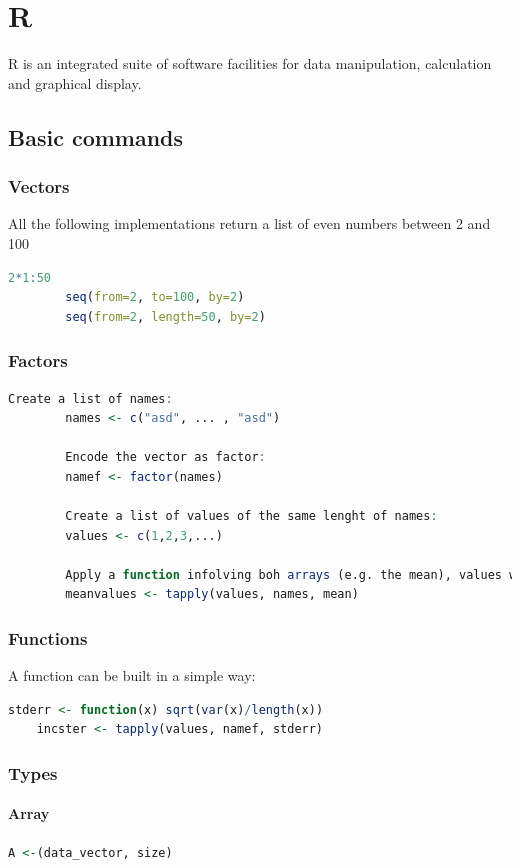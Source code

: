 \chapter{R}
	R is an integrated suite of software facilities for data manipulation, calculation and graphical
	display. \cite{venables2015introduction}
	\section{Basic commands}
	\subsection{Vectors}
	All the following implementations return a list of even numbers between 2 and 100
	\begin{lstlisting}[language=R]
		2*1:50
		seq(from=2, to=100, by=2)
		seq(from=2, length=50, by=2)
	\end{lstlisting}
		
	\subsection{Factors}
	\begin{lstlisting}[language=R]
		Create a list of names:
		names <- c("asd", ... , "asd")
		
		Encode the vector as factor:
		namef <- factor(names)
		
		Create a list of values of the same lenght of names:
		values <- c(1,2,3,...)
		
		Apply a function infolving boh arrays (e.g. the mean), values will be grouped accordingly with factors
		meanvalues <- tapply(values, names, mean)
	\end{lstlisting}

	
	\subsection{Functions}
	A function can be built in a simple way:
	\begin{lstlisting}[language=R]
	stderr <- function(x) sqrt(var(x)/length(x))
	incster <- tapply(values, namef, stderr)
	\end{lstlisting}
	
	\subsection{Types}
	\subsubsection{Array}
	\begin{lstlisting}[language=R]
	A <-(data_vector, size)
	\end{lstlisting}
	
